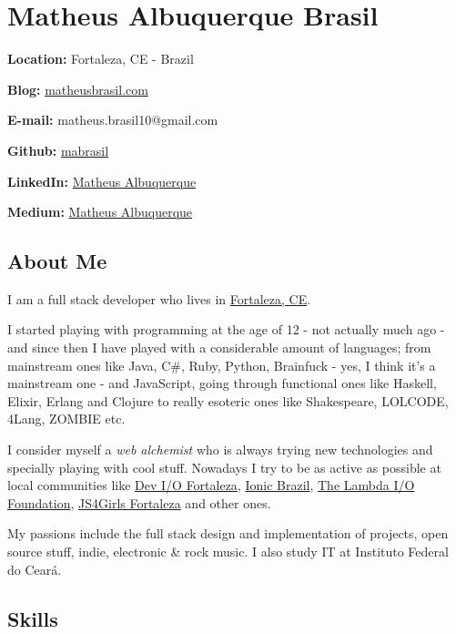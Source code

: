\documentclass[]{article}
\date{}
\begin{document}
\section{Matheus Albuquerque Brasil}\label{matheus-albuquerque-brasil}

\textbf{Location:} Fortaleza, CE - Brazil

\textbf{Blog:} \href{http://matheusbrasil.com}{matheusbrasil.com}

\textbf{E-mail:} matheus.brasil10@gmail.com

\textbf{Github:} \href{https://github.com/mabrasil}{mabrasil}

\textbf{LinkedIn:}
\href{https://www.linkedin.com/in/matheusalbuquerque}{Matheus
Albuquerque}

\textbf{Medium:} \href{https://medium.com/@matheusalbuquerque}{Matheus
Albuquerque}

\subsection{About Me}\label{about-me}

I am a full stack developer who lives in
\href{http://pt.wikipedia.org/wiki/Fortaleza}{Fortaleza, CE}.

I started playing with programming at the age of 12 - not actually much
ago - and since then I have played with a considerable amount of
languages; from mainstream ones like Java, C\#, Ruby, Python, Brainfuck
- yes, I think it's a mainstream one - and JavaScript, going through
functional ones like Haskell, Elixir, Erlang and Clojure to really
esoteric ones like Shakespeare, LOLCODE, 4Lang, ZOMBIE etc.

I consider myself a \emph{web alchemist} who is always trying new
technologies and specially playing with cool stuff. Nowadays I try to be
as active as possible at local communities like
\href{https://www.facebook.com/groups/fortalezadevelopers/}{Dev I/O
Fortaleza}, \href{http://ionicbrazil.com/}{Ionic Brazil},
\href{https://github.com/lambda-io}{The Lambda I/O Foundation},
\href{http://js4girls-fortaleza.github.io/}{JS4Girls Fortaleza} and
other ones.

My passions include the full stack design and implementation of
projects, open source stuff, indie, electronic \& rock music. I also
study IT at Instituto Federal do Ceará.

\subsection{Skills}\label{skills}
\end{document}
